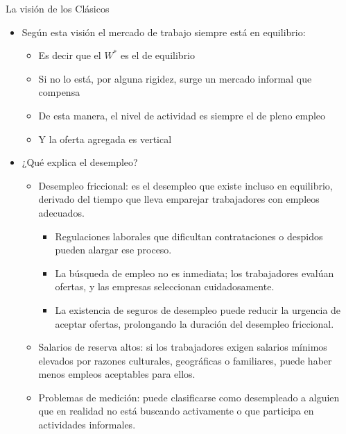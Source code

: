 \documentclass{beamer}
\begin{document}
\begin{frame}{La visión de los Clásicos}
    \small
    \begin{itemize}
        \item Según esta visión el mercado de trabajo siempre está en equilibrio:
        \begin{itemize}
            \item Es decir que el $W^{*}$ es el de equilibrio
            \item Si no lo está, por alguna rigidez, surge un mercado informal que compensa
            \item De esta manera, el nivel de actividad es siempre el de pleno empleo
            \item Y la oferta agregada es vertical
        \end{itemize}
        \item ¿Qué explica el desempleo?
        \begin{itemize}
            \item Desempleo friccional: es el desempleo que existe incluso en equilibrio, derivado del tiempo que lleva emparejar trabajadores con empleos adecuados.
            \begin{itemize}
                \item Regulaciones laborales que dificultan contrataciones o despidos pueden alargar ese proceso.
                \item La búsqueda de empleo no es inmediata; los trabajadores evalúan ofertas, y las empresas seleccionan cuidadosamente.
                \item La existencia de seguros de desempleo puede reducir la urgencia de aceptar ofertas, prolongando la duración del desempleo friccional.
            \end{itemize}
            \item Salarios de reserva altos: si los trabajadores exigen salarios mínimos elevados por razones culturales, geográficas o familiares, puede haber menos empleos aceptables para ellos.
            \item Problemas de medición: puede clasificarse como desempleado a alguien que en realidad no está buscando activamente o que participa en actividades informales.
        \end{itemize}
    \end{itemize}
\end{frame}
\end{document}
